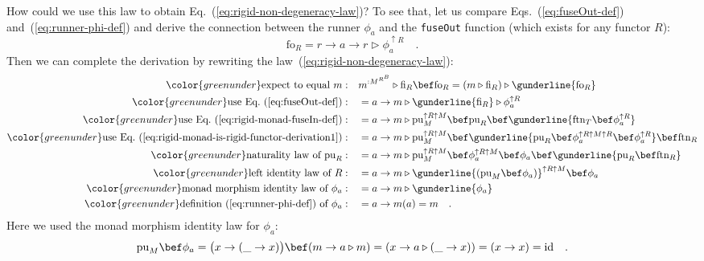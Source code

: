 How could we use this law to obtain Eq.~(\ref{eq:rigid-non-degeneracy-law})?
To see that, let us compare Eqs.~(\ref{eq:fuseOut-def}) and~(\ref{eq:runner-phi-def})
and derive the connection between the runner $\phi_{a}$ and the \lstinline!fuseOut!
function (which exists for any functor $R$):
\[
\text{fo}_{R}=r\rightarrow a\rightarrow r\triangleright\phi_{a}^{\uparrow R}\quad.
\]
Then we can complete the derivation by rewriting the law~(\ref{eq:rigid-non-degeneracy-law}):
\begin{align*}
{\color{greenunder}\text{expect to equal }m:}\quad & m^{:M^{R^{B}}}\triangleright\text{fi}_{R}\bef\text{fo}_{R}=\left(m\triangleright\text{fi}_{R}\right)\triangleright\gunderline{\text{fo}_{R}}\\
{\color{greenunder}\text{use Eq.~(\ref{eq:fuseOut-def})}:}\quad & =a\rightarrow m\triangleright\gunderline{\text{fi}_{R}}\triangleright\phi_{a}^{\uparrow R}\\
{\color{greenunder}\text{use Eq.~(\ref{eq:rigid-monad-fuseIn-def})}:}\quad & =a\rightarrow m\triangleright\text{pu}_{M}^{\uparrow R\uparrow M}\bef\text{pu}_{R}\bef\gunderline{\text{ftn}_{T}\bef\phi_{a}^{\uparrow R}}\\
{\color{greenunder}\text{use Eq.~(\ref{eq:rigid-monad-is-rigid-functor-derivation1})}:}\quad & =a\rightarrow m\triangleright\text{pu}_{M}^{\uparrow R\uparrow M}\bef\gunderline{\text{pu}_{R}\bef\phi_{a}^{\uparrow R\uparrow M\uparrow R}\bef\phi_{a}^{\uparrow R}}\bef\text{ftn}_{R}\\
{\color{greenunder}\text{naturality law of }\text{pu}_{R}:}\quad & =a\rightarrow m\triangleright\text{pu}_{M}^{\uparrow R\uparrow M}\bef\phi_{a}^{\uparrow R\uparrow M}\bef\phi_{a}\bef\gunderline{\text{pu}_{R}\bef\text{ftn}_{R}}\\
{\color{greenunder}\text{left identity law of }R:}\quad & =a\rightarrow m\triangleright\gunderline{(\text{pu}_{M}\bef\phi_{a})}^{\uparrow R\uparrow M}\bef\phi_{a}\\
{\color{greenunder}\text{monad morphism identity law of }\phi_{a}:}\quad & =a\rightarrow m\triangleright\gunderline{\phi_{a}}\\
{\color{greenunder}\text{definition~(\ref{eq:runner-phi-def}) of }\phi_{a}:}\quad & =a\rightarrow m(a)=m\quad.
\end{align*}
Here we used the monad morphism identity law for $\phi_{a}$:
\[
\text{pu}_{M}\bef\phi_{a}=\big(x\rightarrow(\_\rightarrow x)\big)\bef(m\rightarrow a\triangleright m)=\left(x\rightarrow a\triangleright(\_\rightarrow x)\right)=\left(x\rightarrow x\right)=\text{id}\quad.
\]


